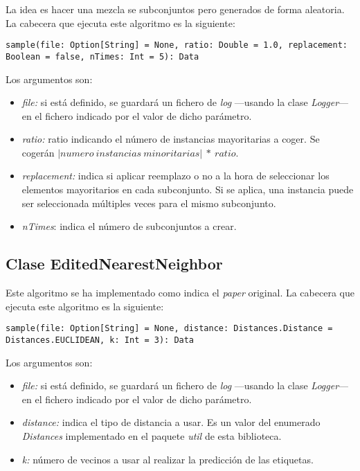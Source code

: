 La idea es hacer una mezcla se subconjuntos pero generados de forma aleatoria. La cabecera que ejecuta este algoritmo es la siguiente:

\begin{lstlisting}[frame=single, basicstyle=\scriptsize, breaklines=true]
sample(file: Option[String] = None, ratio: Double = 1.0, replacement: Boolean = false, nTimes: Int = 5): Data
\end{lstlisting}

Los argumentos son:

\begin{itemize}
    \item \textit{file:} si está definido, se guardará un fichero de \textit{log} —usando la clase \textit{Logger}— en el fichero indicado por el valor de dicho parámetro.
    \item \textit{ratio:} ratio indicando el número de instancias mayoritarias a coger. Se cogerán $\left | numero\ instancias\ minoritarias \right | \ *\ ratio$.
    \item \textit{replacement:} indica si aplicar reemplazo o no a la hora de seleccionar los elementos mayoritarios en cada subconjunto. Si se aplica, una instancia puede ser seleccionada múltiples veces para el mismo subconjunto.
    \item \textit{nTimes}: indica el número de subconjuntos a crear.
\end{itemize}

\subsection{Clase EditedNearestNeighbor} \label{subsec:impl_editednearestneighbor}

Este algoritmo se ha implementado como indica el \textit{paper} original. La cabecera que ejecuta este algoritmo es la siguiente:

\begin{lstlisting}[frame=single, basicstyle=\scriptsize, breaklines=true]
sample(file: Option[String] = None, distance: Distances.Distance = Distances.EUCLIDEAN, k: Int = 3): Data
\end{lstlisting}

Los argumentos son:

\begin{itemize}
    \item \textit{file:} si está definido, se guardará un fichero de \textit{log} —usando la clase \textit{Logger}— en el fichero indicado por el valor de dicho parámetro.
    \item \textit{distance:} indica el tipo de distancia a usar. Es un valor del enumerado \textit{Distances} implementado en el paquete \textit{util} de esta biblioteca.
    \item \textit{k:} número de vecinos a usar al realizar la predicción de las etiquetas.
\end{itemize}

